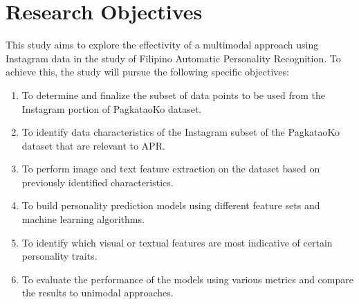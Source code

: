 




\section{Research Objectives}
\label{sec: objectives}
This study aims to explore the effectivity of a multimodal approach using Instagram data in the study of Filipino Automatic Personality Recognition. To achieve this, the study will pursue the following specific objectives:

\begin{enumerate}
	\item To determine and finalize the subset of data points to be used from the Instagram portion of PagkataoKo dataset.
 
	\item To identify data characteristics of the Instagram subset of the PagkataoKo dataset that are relevant to APR.

	\item To perform image and text feature extraction on the dataset based on previously identified characteristics.

	\item To build personality prediction models using different feature sets and machine learning algorithms.

 	\item To identify which visual or textual features are most indicative of certain personality traits.

	\item To evaluate the performance of the models using various metrics and compare the results to unimodal approaches.
\end{enumerate}



